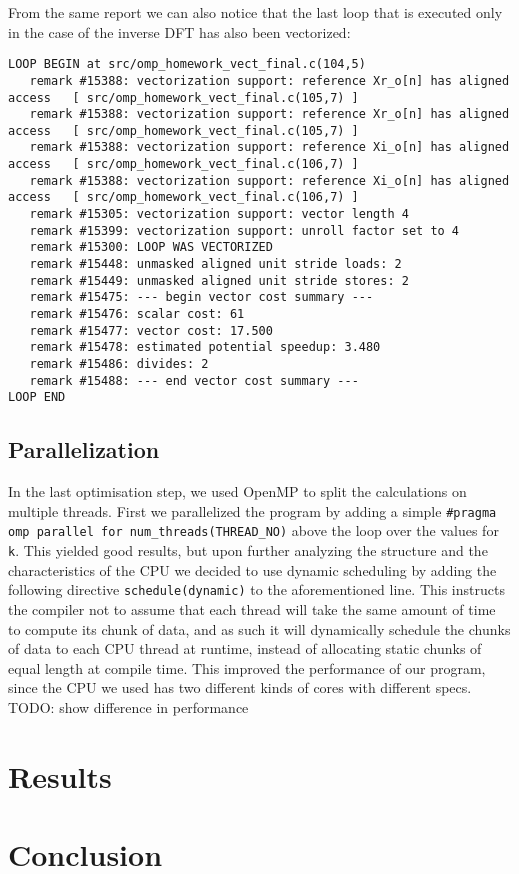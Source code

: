 \documentclass{article}
\begin{document}
From the same report we can also notice that the last loop that is executed only in the case of the inverse DFT has also been vectorized:
\begin{verbatim}
LOOP BEGIN at src/omp_homework_vect_final.c(104,5)
   remark #15388: vectorization support: reference Xr_o[n] has aligned access   [ src/omp_homework_vect_final.c(105,7) ]
   remark #15388: vectorization support: reference Xr_o[n] has aligned access   [ src/omp_homework_vect_final.c(105,7) ]
   remark #15388: vectorization support: reference Xi_o[n] has aligned access   [ src/omp_homework_vect_final.c(106,7) ]
   remark #15388: vectorization support: reference Xi_o[n] has aligned access   [ src/omp_homework_vect_final.c(106,7) ]
   remark #15305: vectorization support: vector length 4
   remark #15399: vectorization support: unroll factor set to 4
   remark #15300: LOOP WAS VECTORIZED
   remark #15448: unmasked aligned unit stride loads: 2 
   remark #15449: unmasked aligned unit stride stores: 2 
   remark #15475: --- begin vector cost summary ---
   remark #15476: scalar cost: 61 
   remark #15477: vector cost: 17.500 
   remark #15478: estimated potential speedup: 3.480 
   remark #15486: divides: 2 
   remark #15488: --- end vector cost summary ---
LOOP END
\end{verbatim}

\subsection{Parallelization}
In the last optimisation step, we used OpenMP to split the calculations on multiple threads. First we parallelized the program by adding a simple \verb|#pragma omp parallel for num_threads(THREAD_NO)| above the loop over the values for \verb|k|. This yielded good results, but upon further analyzing the structure and the characteristics of the CPU we decided to use dynamic scheduling by adding the following directive \verb|schedule(dynamic)| to the aforementioned line. This instructs the compiler not to assume that each thread will take the same amount of time to compute its chunk of data, and as such it will dynamically schedule the chunks of data to each CPU thread at runtime, instead of allocating static chunks of equal length at compile time. This improved the performance of our program, since the CPU we used has two different kinds of cores with different specs. TODO: show difference in performance 

\section{Results}

\section{Conclusion}
\end{document}
